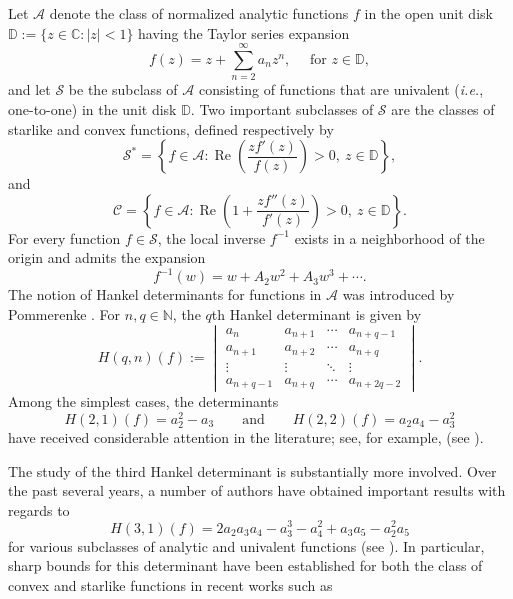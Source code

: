 \documentclass[a4paper,12pt,reqno]{amsart}
\numberwithin{equation}{section}
\begin{document}
Let $\mathcal{A}$ denote the class of normalized analytic functions $f$ in the open unit disk
$\mathbb{D}:=\{z\in\mathbb{C}:|z|<1\}$ having the Taylor series  expansion
\begin{equation}
	\label{eq:1.1}
	f(z)=z+\sum_{n=2}^{\infty}a_n z^n,\quad \text{ for } z\in\mathbb{D},
\end{equation}
and let $\mathcal{S}$ be the subclass of $\mathcal{A}$ consisting of functions that are univalent ({\it i.e.}, one-to-one) in the unit disk $\mathbb{D}$. Two important subclasses of $\mathcal{S}$ are the classes of starlike and convex functions, defined respectively by
\[
\mathcal{S}^{*}
=
\left\{
f \in \mathcal{A} : \operatorname{Re}\left( \frac{z f'(z)}{f(z)} \right) > 0,\ z \in \mathbb{D}
\right\},
\]
and
\[
\mathcal{C}
=
\left\{
f \in \mathcal{A} : \operatorname{Re}\left( 1 + \frac{z f''(z)}{f'(z)} \right) > 0,\ z \in \mathbb{D}
\right\}.
\]
For every function \(f\in\mathcal{S}\), the local inverse \(f^{-1}\) exists in a neighborhood of the origin and admits the expansion
\[
f^{-1}(w)=w+A_2w^2+A_3w^3+\cdots .
\]
The notion of Hankel determinants for functions in \(\mathcal{A}\) was introduced by Pommerenke \cite{Pommerenke1966}. For \(n,q\in\mathbb{N}\), the \(q\)th Hankel determinant is given by
\[
H(q,n)(f)
:=
\begin{vmatrix}
	a_n     & a_{n+1}   & \cdots & a_{n+q-1} \\
	a_{n+1} & a_{n+2}   & \cdots & a_{n+q}   \\
	\vdots  & \vdots    & \ddots & \vdots    \\
	a_{n+q-1} & a_{n+q} & \cdots & a_{n+2q-2}
\end{vmatrix}.
\]
Among the simplest cases, the determinants
\[
H(2,1)(f)=a_2^2-a_3
\qquad\text{and}\qquad
H(2,2)(f)=a_2a_4-a_3^2
\]
have received considerable attention in the literature; see, for example,
(see \cite{ChoKowalczykKwonLeckoSim2018,LeeRavichandranSupramanian2013}).\\
\par The study of the third Hankel determinant is substantially more involved. Over the past several years, a number of authors have obtained important results with regards to 
\[
H(3,1)(f)=2a_2a_3a_4-a_3^3-a_4^2+a_3a_5-a_2^2a_5
\]
for various subclasses of analytic and univalent functions (see
\cite{BangaKumar2020,KowalczykLeckoLeckoSim2018,KwonLeckoSim2019,LeckoSimSmiarowska2019,RiazRazaThomas2022}).
In particular, sharp bounds for this determinant have been established for both the class of  convex and starlike functions in recent works such as
\end{document}
